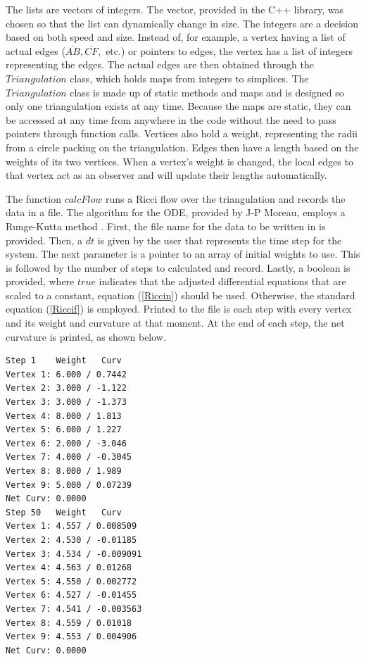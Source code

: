 \documentclass[12pt]{article}
\begin{document}
\noindent The lists are vectors of integers. The vector, provided in the C++ library, was chosen so that the list can dynamically change in size. The integers are a decision based on both speed and size. Instead of, for example, a vertex having a list of actual edges ($\overline{AB}, \overline{CF},$ etc.) or pointers to edges, the vertex has a list of integers representing the edges. The actual edges are then obtained through the $Triangulation$ class, which holds maps from integers to simplices. The $Triangulation$ class is made up of static methods and maps and is designed so only one triangulation exists at any time. Because the maps are static, they can be accessed at any time from anywhere in the code without the need to pass pointers through function calls. Vertices also hold a weight, representing the radii from a circle packing on the triangulation. Edges then have a length based on the weights of its two vertices. When a vertex's weight is changed, the local edges to that vertex act as an observer and will update their lengths automatically.\newline

\noindent The function $calcFlow$ runs a Ricci flow over the triangulation and records the data in a file. The algorithm for the ODE, provided by J-P Moreau, employs a Runge-Kutta method \cite{JPM}. First, the file name for the data to be written in is provided. Then, a $dt$ is given by the user that represents the time step for the system. The next parameter is a pointer to an array of initial weights to use. This is followed by the number of steps to calculated and record. Lastly, a boolean is provided, where $true$ indicates that the adjusted differential equations that are scaled to a constant, equation (\ref{Riccin}) should be used. Otherwise, the standard equation (\ref{Riccif}) is employed. Printed to the file is each step with every vertex and its weight and curvature at that moment. At the end of each step, the net curvature is printed, as shown below.

\begin{multicols}{2}
\begin{verbatim}
Step 1    Weight   Curv
Vertex 1: 6.000 / 0.7442
Vertex 2: 3.000 / -1.122
Vertex 3: 3.000 / -1.373
Vertex 4: 8.000 / 1.813
Vertex 5: 6.000 / 1.227
Vertex 6: 2.000 / -3.046
Vertex 7: 4.000 / -0.3045
Vertex 8: 8.000 / 1.989
Vertex 9: 5.000 / 0.07239
Net Curv: 0.0000
Step 50   Weight   Curv
Vertex 1: 4.557 / 0.008509
Vertex 2: 4.530 / -0.01185
Vertex 3: 4.534 / -0.009091
Vertex 4: 4.563 / 0.01268
Vertex 5: 4.550 / 0.002772
Vertex 6: 4.527 / -0.01455
Vertex 7: 4.541 / -0.003563
Vertex 8: 4.559 / 0.01018
Vertex 9: 4.553 / 0.004906
Net Curv: 0.0000
\end{verbatim}
\end{multicols}
\end{document}
